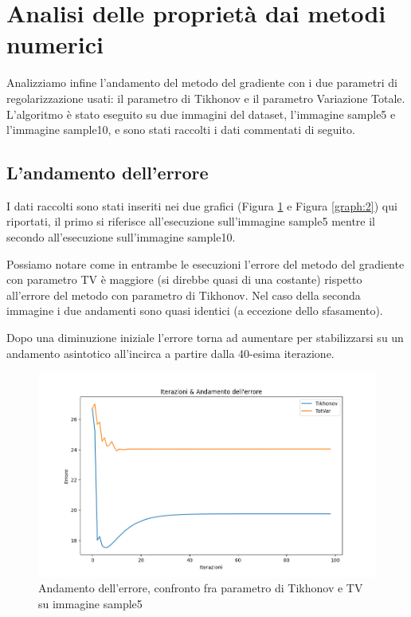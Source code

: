 \documentclass[12pt]{article}
\begin{document}
    \newpage

\section{Analisi delle proprietà dai metodi numerici}
    Analizziamo infine l'andamento del metodo del gradiente con i due parametri di regolarizzazione usati: il parametro di Tikhonov e il parametro Variazione Totale. L'algoritmo è stato eseguito su due immagini del dataset, l'immagine sample5 e l'immagine sample10, e sono stati raccolti i dati commentati di seguito.
    
    \subsection{L'andamento dell'errore}
    I dati raccolti sono stati inseriti nei due grafici (Figura \ref{graph:1} e Figura \ref{graph:2}) qui riportati, il primo si riferisce all'esecuzione sull'immagine sample5 mentre il secondo all'esecuzione sull'immagine sample10.
    
    Possiamo notare come in entrambe le esecuzioni l'errore del metodo del gradiente con parametro TV è maggiore (si direbbe quasi di una costante) rispetto all'errore del metodo con parametro di Tikhonov. Nel caso della seconda immagine i due andamenti sono quasi identici (a eccezione dello sfasamento). 
    
    Dopo una diminuzione iniziale l'errore torna ad aumentare per stabilizzarsi su un andamento asintotico all'incirca a partire dalla 40-esima iterazione.
    
    \begin{figure}[h!]
    \centering
    \includegraphics[width=12cm]{errors-sample5}
    \caption{Andamento dell'errore, confronto fra parametro di Tikhonov e TV su immagine sample5}
    \label{graph:1}
    \end{figure}
    
\end{document}
